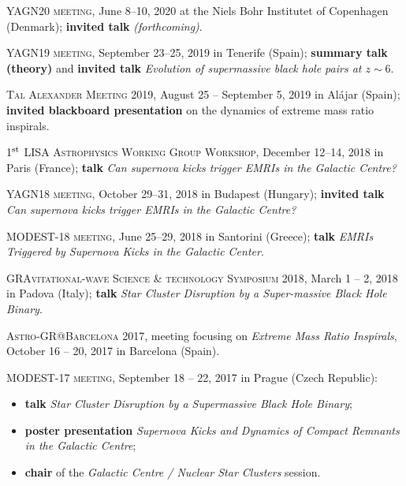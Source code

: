 \documentclass[11pt,a4paper]{article}
\begin{document}
\begin{etaremune}

    \item \textsc{YAGN20 meeting}, June 8--10, 2020 at the Niels Bohr Institutet of Copenhagen (Denmark);  {\bf invited talk} {\it(forthcoming)}.


    \item \textsc{YAGN19 meeting}, September 23--25, 2019 in  Tenerife (Spain); \textbf{summary talk (theory)} and {\bf invited talk}  {\it Evolution of supermassive black hole pairs at $z\sim 6$}.

    \item \textsc{Tal Alexander Meeting 2019,}%
     August 25 -- September 5, 2019 in Al\'ajar (Spain); {\bf invited blackboard presentation} on the dynamics of extreme mass ratio inspirals.

    \item \textsc{1$^{\rm st}$ LISA Astrophysics Working Group Workshop}, December 12--14, 2018 in  Paris (France); 
 {\bf talk} {\it Can supernova kicks trigger EMRIs in the Galactic Centre?}

    \item \textsc{YAGN18 meeting}, October 29--31, 2018 in  Budapest (Hungary); {\bf invited talk} {\it Can supernova kicks trigger EMRIs in the Galactic Centre?}

    \item \textsc{MODEST-18 meeting}, June 25--29, 2018 in Santorini (Greece); {\bf talk} {\it  EMRIs Triggered by Supernova Kicks in the Galactic Center}.

    \item \textsc{GRAvitational-wave Science \& technology Symposium 2018,} March 1 -- 2, 2018  in Padova (Italy);  {\bf talk} {\it Star Cluster Disruption by a Super-massive Black Hole Binary}.


    \item \textsc{Astro-GR@Barcelona 2017,} meeting focusing on {\it Extreme Mass Ratio Inspirals}, October 16 -- 20, 2017 in Barcelona (Spain).

    \item \textsc{ MODEST-17 meeting},  September 18 -- 22, 2017 in Prague (Czech Republic):
\vspace{-10pt}

    \begin{itemize}[leftmargin=5mm]
    \setlength\itemsep{-2pt}
        \item {\bf talk} {\it Star Cluster Disruption by a Supermassive Black Hole Binary}; 
        \item {\bf poster presentation} {\it Supernova Kicks and Dynamics of Compact Remnants in the Galactic Centre}; 
        \item {\bf chair}  of the {\it Galactic Centre / Nuclear Star Clusters} session.
    

\end{itemize}
\end{etaremune}
\end{document}
